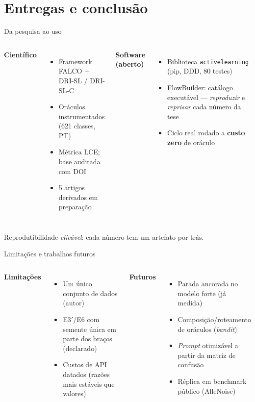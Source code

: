 \documentclass[aspectratio=169,11pt]{beamer}
\begin{document}
\section{Entregas e conclusão}
\begin{frame}{Da pesquisa ao uso}
\begin{columns}[T]
\textbf{Científico}
\begin{itemize}\footnotesize
  \item Framework FALCO + DRI-SL / DRI-SL-C
  \item Oráculos instrumentados (621 classes, PT)
  \item Métrica LCE; base auditada com DOI
  \item 5 artigos derivados em preparação
\end{itemize}
\textbf{Software (aberto)}
\begin{itemize}\footnotesize
  \item Biblioteca \texttt{activelearning} (pip, DDD, 80 testes)
  \item FlowBuilder: catálogo executável --- \emph{reproduzir} e \emph{reprisar}
        cada número da tese
  \item Ciclo real rodado a \textbf{custo zero} de oráculo
\end{itemize}
\end{columns}
\vspace{0.3em}
\centering\footnotesize\color{ufprgreen}
Reprodutibilidade \emph{clicável}: cada número tem um artefato por trás.
\end{frame}


\begin{frame}{Limitações e trabalhos futuros}
\begin{columns}[T]
\textbf{Limitações}
\begin{itemize}\footnotesize
  \item Um único conjunto de dados (autor)
  \item E3$'$/E6 com semente única em parte dos braços (declarado)
  \item Custos de API datados (razões mais estáveis que valores)
\end{itemize}
\textbf{Futuros}
\begin{itemize}\footnotesize
  \item Parada ancorada no modelo forte (já medida)
  \item Composição/roteamento de oráculos (\textit{bandit})
  \item \textit{Prompt} otimizável a partir da matriz de confusão
  \item Réplica em benchmark público (AlleNoise)
\end{itemize}
\end{columns}
\end{frame}
\end{document}
